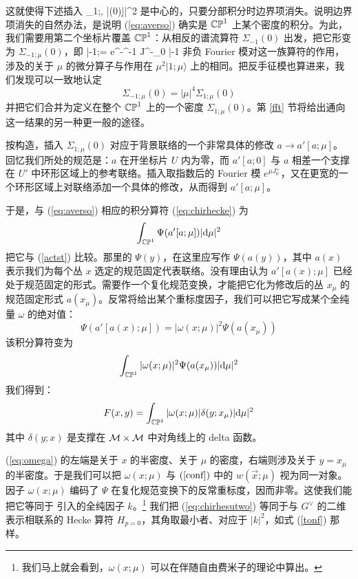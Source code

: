 这就使得下述插入
\be \label{eq:averso}
\int \Sigma_{1;\mu, \bar \mu}(0)|\d \mu|^2
\ee
是中心的，只要分部积分时边界项消失。说明边界项消失的自然办法，是说明 (\ref{eq:averso}) 确实是 ${\mathbb{CP}}^1$ 上某个密度的积分。为此，我们需要用第二个坐标片覆盖 ${\mathbb{CP}}^1$：从相反的谱流算符 $\Sigma_{-1}(0)$ 出发，把它形变为 $\Sigma_{-1;\mu}(0)$，即
\be 
|-1;\mu\rangle = e^{-\mu^{-1} J^-_0 }|-1\rangle
\ee
非负 Fourier 模对这一族算符的作用，涉及的关于 $\mu$ 的微分算子与作用在 $\mu^2 |1;\mu\rangle$ 上的相同。把反手征模也算进来，我们发现可以一致地认定
\begin{equation}
\Sigma_{-1;\mu}(0) = |\mu|^4 \Sigma_{1;\mu}(0)
\end{equation}
并把它们合并为定义在整个 ${\mathbb{CP}}^1$ 上的一个密度 $\Sigma_{1;\mu}(0)$。第 \ref{fft} 节将给出通向这一结果的另一种更一般的途径。

按构造，插入 $\Sigma_{1;\mu}(0)$ 对应于背景联络的一个非常具体的修改 $a \to a'[a;\mu]$。回忆我们所处的规范是：$a$ 在开坐标片 $U$ 内为零，而 $a'[a;0]$ 与 $a$ 相差一个支撑在 $U'$ 中环形区域上的参考联络。插入取指数后的 Fourier 模 $e^{\mu J^+_0}$，又在更宽的一个环形区域上对联络添加一个具体的修改，从而得到 $a'[a;\mu]$。

于是，与 (\ref{eq:averso}) 相应的积分算符 (\ref{eq:chirhecke}) 为
 \begin{equation}\label{eq:chirhesutwo}
\int_{{\mathbb{CP}}^1}\Psi(a'[a;\mu])|{\mathrm d} \mu|^2
 \end{equation}
把它与 (\ref{actst}) 比较。那里的 $\Psi(y)$，在这里应写作 $\Psi(a(y))$，其中 $a(x)$ 表示我们为每个丛 $x$ 选定的规范固定代表联络。没有理由认为 $a'[a(x);\mu]$ 已经处于规范固定的形式。需要作一个复化规范变换，才能把它化为修改后的丛 $x_\mu$ 的规范固定形式 $a(x_\mu)$。反常将给出某个重标度因子，我们可以把它写成某个全纯量 $\omega$ 的绝对值：
  \begin{equation} \label{eq:omega}
\Psi(a'[a(x);\mu]) = |\omega(x;\mu)|^2 \Psi(a(x_\mu))
 \end{equation} 
该积分算符变为
  \begin{equation}
\int_{{\mathbb{CP}}^1}|\omega(x;\mu)|^2 \Psi(a(x_\mu))|{\mathrm d} \mu|^2
 \end{equation}
我们得到：
  \begin{equation}
F(x,y) = \int_{{\mathbb{CP}}^1} |\omega(x;\mu)|\delta(y;x_\mu)|{\mathrm d} \mu|^2
 \end{equation}
其中 $\delta(y;x)$ 是支撑在 ${\mathcal M} \times {\mathcal M}$ 中对角线上的 delta 函数。

(\ref{eq:omega}) 的左端是关于 $x$ 的半密度、关于 $\mu$ 的密度，右端则涉及关于 $y=x_\mu$ 的半密度。于是我们可以把 $\omega(x;\mu)$ 与 $(\ref{conf})$ 中的 $w(\vec x;\mu)$ 视为同一对象。因子 $\omega(x;\mu)$ 编码了 $\Psi$ 在复化规范变换下的反常重标度，因而非零。这使我们能把它等同于 \cite{BD} 引入的全纯因子 $k$。\footnote{我们马上就会看到，$\omega(x;\mu)$ 可以在伴随自由费米子的理论中算出。} 我们把 (\ref{eq:chirhesutwo}) 等同于与 $G^\vee$ 的二维表示相联系的 Hecke 算符 $H_{p=0}$，其角取最小者、对应于 $|k|^2$，如式 (\ref{tonf}) 那样。


